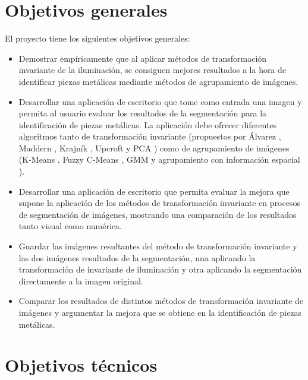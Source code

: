 
\section{Objetivos generales}\label{objetivos-generales}

El proyecto tiene los siguientes objetivos generales:

\begin{itemize}
    \tightlist
        \item
            Demostrar empíricamente que al aplicar métodos de transformación invariante de la iluminación, se consiguen mejores resultados a la hora de identificar piezas metálicas mediante métodos de agrupamiento de imágenes.
        \item
            Desarrollar una aplicación de escritorio que tome como entrada una imagen y  permita al usuario evaluar los resultados de la segmentación para la identificación de piezas metálicas. La aplicación debe ofrecer diferentes algoritmos tanto de transformación invariante (propuestos por Álvarez \cite{alvarez2011}, Maddern \cite{maddern2014}, Krajník \cite{krajník2015}, Upcroft \cite{upcroft2014} y PCA \cite{pca2017}) como de agrupamiento de imágenes (K-Means \cite{MATLAB:2023bKmeans}, Fuzzy C-Means \cite{MATLAB:2023bFuzzy}, GMM \cite{MATLAB:2023bGMM} y agrupamiento con información espacial \cite{wang2012hmrf}).
        \item
            Desarrollar una aplicación de escritorio que permita evaluar la mejora que supone la aplicación de los métodos de transformación invariante en procesos de segmentación de imágenes, mostrando una comparación de los resultados tanto visual como numérica.
        \item
            Guardar las imágenes resultantes del método de transformación invariante y las dos imágenes  resultados de la segmentación, una aplicando la transformación de invariante de iluminación y otra aplicando la segmentación directamente a la imagen original.
        \item
            Comparar los resultados de distintos métodos de transformación invariante de imágenes y argumentar la mejora que se obtiene en la identificación de piezas metálicas.
\end{itemize}

\section{Objetivos técnicos}\label{objetivos-tecnicos}

